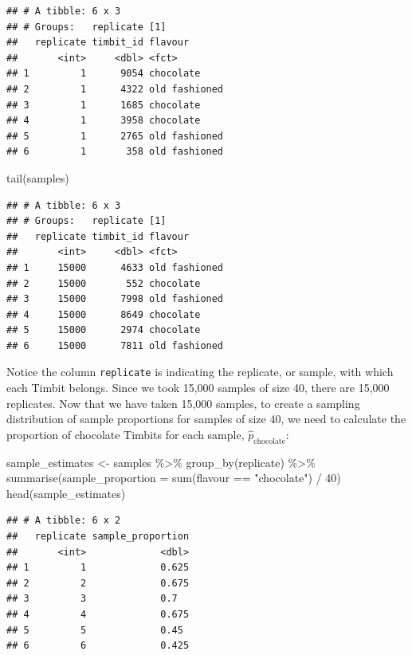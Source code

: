 \documentclass[
]{krantz}
\makeatletter
\newenvironment{Shaded}{\begin{snugshade}}{\end{snugshade}}
\newcommand{\AttributeTok}[1]{\textcolor[rgb]{0.61,0.61,0.61}{#1}}
\newcommand{\DecValTok}[1]{\textcolor[rgb]{0.06,0.06,0.06}{#1}}
\newcommand{\FunctionTok}[1]{\textcolor[rgb]{0,0,0}{#1}}
\newcommand{\NormalTok}[1]{#1}
\newcommand{\OtherTok}[1]{\textcolor[rgb]{0.37,0.37,0.37}{#1}}
\newcommand{\SpecialCharTok}[1]{\textcolor[rgb]{0,0,0}{#1}}
\newcommand{\StringTok}[1]{\textcolor[rgb]{0.5,0.5,0.5}{#1}}
\newenvironment{kframe}{%
\medskip{}
\setlength{\fboxsep}{.8em}
 \def\at@end@of@kframe{}%
 \ifinner\ifhmode%
  \def\at@end@of@kframe{\end{minipage}}%
  \begin{minipage}{\columnwidth}%
 \fi\fi%
 \def\FrameCommand##1{\hskip\@totalleftmargin \hskip-\fboxsep
 \colorbox{shadecolor}{##1}\hskip-\fboxsep
     \hskip-\linewidth \hskip-\@totalleftmargin \hskip\columnwidth}%
 \MakeFramed {\advance\hsize-\width
   \@totalleftmargin\z@ \linewidth\hsize
   \@setminipage}}%
 {\par\unskip\endMakeFramed%
 \at@end@of@kframe}
\renewenvironment{Shaded}{\begin{kframe}}{\end{kframe}}
\makeatother
\begin{document}
\begin{verbatim}
## # A tibble: 6 x 3
## # Groups:   replicate [1]
##   replicate timbit_id flavour      
##       <int>     <dbl> <fct>        
## 1         1      9054 chocolate    
## 2         1      4322 old fashioned
## 3         1      1685 chocolate    
## 4         1      3958 chocolate    
## 5         1      2765 old fashioned
## 6         1       358 old fashioned
\end{verbatim}

\begin{Shaded}
\begin{Highlighting}[]
\FunctionTok{tail}\NormalTok{(samples)}
\end{Highlighting}
\end{Shaded}

\begin{verbatim}
## # A tibble: 6 x 3
## # Groups:   replicate [1]
##   replicate timbit_id flavour      
##       <int>     <dbl> <fct>        
## 1     15000      4633 old fashioned
## 2     15000       552 chocolate    
## 3     15000      7998 old fashioned
## 4     15000      8649 chocolate    
## 5     15000      2974 chocolate    
## 6     15000      7811 old fashioned
\end{verbatim}

Notice the column \texttt{replicate} is indicating the replicate, or sample, with which each
Timbit belongs. Since we took 15,000 samples of size 40, there are 15,000 replicates.
Now that we have taken 15,000 samples, to create a sampling distribution of sample proportions for samples of size 40, we need to calculate the proportion of chocolate Timbits for each sample, \(\hat{p}_\text{chocolate}\):

\begin{Shaded}
\begin{Highlighting}[]
\NormalTok{sample\_estimates }\OtherTok{\textless{}{-}}\NormalTok{ samples }\SpecialCharTok{\%\textgreater{}\%}
  \FunctionTok{group\_by}\NormalTok{(replicate) }\SpecialCharTok{\%\textgreater{}\%}
  \FunctionTok{summarise}\NormalTok{(}\AttributeTok{sample\_proportion =} \FunctionTok{sum}\NormalTok{(flavour }\SpecialCharTok{==} \StringTok{"chocolate"}\NormalTok{) }\SpecialCharTok{/} \DecValTok{40}\NormalTok{)}
\FunctionTok{head}\NormalTok{(sample\_estimates)}
\end{Highlighting}
\end{Shaded}

\begin{verbatim}
## # A tibble: 6 x 2
##   replicate sample_proportion
##       <int>             <dbl>
## 1         1             0.625
## 2         2             0.675
## 3         3             0.7  
## 4         4             0.675
## 5         5             0.45 
## 6         6             0.425
\end{verbatim}
\end{document}
